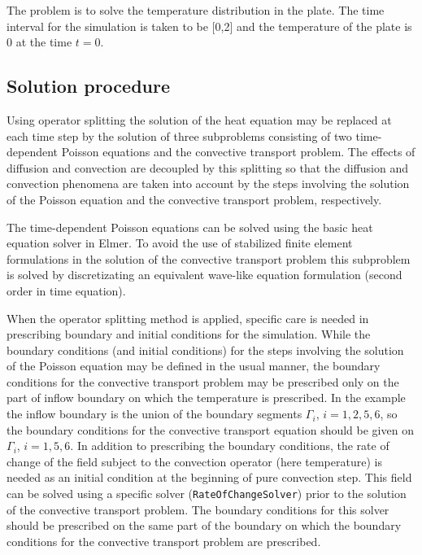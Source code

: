 The problem is to solve the temperature distribution in the plate. 
The time interval for the simulation is taken to be [0,2] and the temperature 
of the plate is 0 at the time $t=0$. 


\subsection*{Solution procedure}

Using operator splitting the solution of the heat equation may be replaced 
at each time step by the solution of three subproblems consisting of two 
time-dependent Poisson equations and the convective transport problem.
The effects of diffusion and convection are decoupled by this 
splitting so that 
the diffusion and convection phenomena are taken into account by the steps 
involving the solution of the Poisson equation and the convective transport 
problem, respectively. 

The time-dependent Poisson equations can be solved using the basic heat 
equation solver in Elmer. To avoid the use of stabilized finite element 
formulations in the solution of the convective transport problem this 
subproblem is solved by discretizating an equivalent wave-like equation 
formulation (second order in time equation). 
  
When the operator splitting method is applied,
specific care is needed in prescribing boundary and initial conditions
for the simulation. While the boundary conditions (and initial conditions) 
for the steps involving the solution of the Poisson equation may be defined in 
the usual manner, the boundary conditions for the convective 
transport problem may be prescribed
only on the part of inflow boundary on which the temperature is prescribed. 
In the example the inflow boundary is the union of the boundary segments 
$\Gamma_i$, $i=1,2,5,6$,
so the boundary conditions for the convective transport equation 
should be given on $\Gamma_i$, $i=1,5,6$.
In addition to prescribing the boundary conditions, the rate of change of
the field subject to the convection operator (here temperature) is needed as 
an initial condition at the beginning of pure convection step. This field 
can be solved using a specific solver ({\tt RateOfChangeSolver}) prior to
the solution of the convective transport problem. 
The boundary conditions for this 
solver should be prescribed on the same part of the boundary on which the 
boundary conditions for the convective transport problem are prescribed.    


